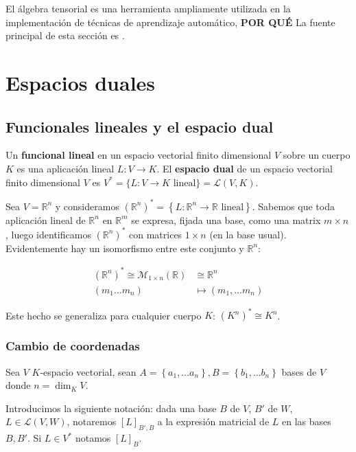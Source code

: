 El álgebra tensorial es una herramienta ampliamente utilizada en la
implementación de técnicas de aprendizaje automático, \textbf{POR QUÉ}
La fuente principal de esta sección es \textcite[chapter 8]{treil2013}.

\section{Espacios duales}\label{espacios-duales}

\subsection{Funcionales lineales y el espacio
dual}\label{funcionales-lineales-y-el-espacio-dual}

Un \textbf{funcional lineal} en un espacio vectorial finito dimensional
\(V\) sobre un cuerpo \(K\) es una aplicación lineal
\(L:V\rightarrow K\). 
{}
El \textbf{espacio dual} de un espacio vectorial finito dimensional
\(V\) es \(V^*=\{L:V\rightarrow K\text{ lineal}\}=\mathcal{L}(V, K)\).

\exampleb
Sea \(V=\mathbb R^n\) y consideramos
\((\mathbb R^n)^*=\left\{L:\mathbb R^n\rightarrow\mathbb R\text{ lineal}\right\}\).
Sabemos que toda aplicación lineal de \(\mathbb{R}^{n}\) en
\(\mathbb{R}^{m}\) se expresa, fijada una base, como una matrix
\(m\times n\), luego identificamos \((\mathbb{R}^{n})^{*}\) con matrices
\(1\times n\) (en la base usual). Evidentemente hay un isomorfismo entre
este conjunto y \(\mathbb{R}^{n}\):

\begin{align*}
  (\mathbb{R}^{n})^{*} \cong \mathcal{M}_{1\times n}(\mathbb{R})&\cong \mathbb{R}^{n} \\
  (m_{1} \dots m_{n}) &\mapsto (m_{1}, \dots m_{n})
\end{align*}

Este hecho se generaliza para cualquier cuerpo \(K\):
\((K^{n})^{*}\cong K^{n}\). \examplee

\subsubsection{Cambio de coordenadas}\label{cambio-de-coordenadas}

Sea \(V\) \(K\)-espacio vectorial, sean
\(A=\left\{a_{1}, \dots a_{n}\right\}, B=\left\{b_{1}, \dots b_{n}\right\}\)
bases de \(V\) donde \(n = \dim_{K}V\).

Introducimos la siguiente notación: dada una base \(B\) de \(V\), \(B'\)
de \(W\), \(L\in\mathcal L(V, W)\), notaremos \([L]_{B', B}\) a la
expresión matricial de \(L\) en las bases \(B, B'\). Si \(L\in V^{*}\)
notamos \([L]_{B}\).

